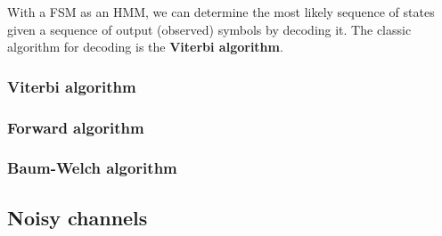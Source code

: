 \documentclass[Report.tex]{subfiles}
\begin{document}
With a FSM as an HMM, we can determine the most likely sequence of states
given a sequence of output (observed) symbols by decoding it. The classic
algorithm for decoding is the \textbf{Viterbi algorithm}.

\subsubsection{Viterbi algorithm}

\subsubsection{Forward algorithm}

\subsubsection{Baum-Welch algorithm}

\subsection{Noisy channels}
\end{document}
